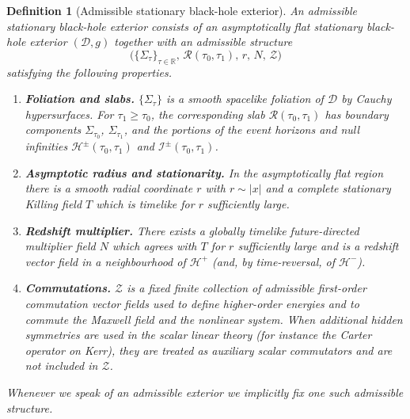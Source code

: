 \documentclass[10pt,a4paper]{amsart}
\newtheorem{definition}{Definition}
\begin{document}
\begin{definition}[Admissible stationary black-hole exterior]\label{def:admissible-exterior}
An \emph{admissible stationary black-hole exterior} consists of an asymptotically flat stationary black-hole exterior $(\mathcal D,g)$ together with an \emph{admissible structure}
\begin{equation}
\bigl(\{\Sigma_{\tau}\}_{\tau\in\mathbb R},\,\mathcal R(\tau_{0},\tau_{1}),\,r,\,N,\,\mathcal Z\bigr)
\end{equation}
satisfying the following properties.
\begin{enumerate}
\item[(G1)] \textbf{Foliation and slabs.}
$\{\Sigma_{\tau}\}$ is a smooth spacelike foliation of $\mathcal D$ by Cauchy hypersurfaces.
For $\tau_{1}\ge\tau_{0}$, the corresponding slab $\mathcal{R}(\tau_{0},\tau_{1})$ has boundary components
$\Sigma_{\tau_{0}}$, $\Sigma_{\tau_{1}}$, and the portions of the event horizons and null infinities
$\mathcal H^{\pm}(\tau_{0},\tau_{1})$ and $\mathcal I^{\pm}(\tau_{0},\tau_{1})$.
\item[(G2)] \textbf{Asymptotic radius and stationarity.}
In the asymptotically flat region there is a smooth radial coordinate $r$ with $r\sim |x|$ and a complete stationary Killing field $T$
which is timelike for $r$ sufficiently large.
\item[(G3)] \textbf{Redshift multiplier.}
There exists a globally timelike future-directed multiplier field $N$ which agrees with $T$ for $r$ sufficiently large
and is a redshift vector field in a neighbourhood of $\mathcal H^{+}$ (and, by time-reversal, of $\mathcal H^{-}$).
\item[(G4)] \textbf{Commutations.}
$\mathcal Z$ is a fixed finite collection of admissible first-order commutation vector fields used to define higher-order energies and to commute the Maxwell field and the nonlinear system. When additional hidden symmetries are used in the scalar linear theory (for instance the Carter operator on Kerr), they are treated as auxiliary scalar commutators and are not included in $\mathcal Z$.
\end{enumerate}
Whenever we speak of an admissible exterior we implicitly fix one such admissible structure.
\end{definition}
\end{document}

